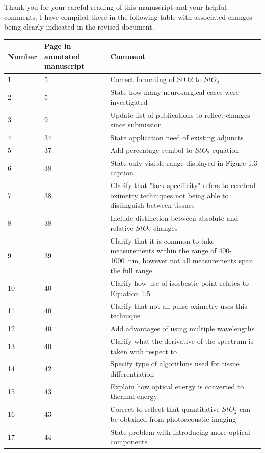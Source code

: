 \documentclass{article}
\begin{document}
Thank you for your careful reading of this manuscript and your helpful comments. I have compiled these in the following table with associated changes being clearly indicated in the revised document. 

\begin{table}
    \centering
    \begin{tabular}{|p{1.5cm}|p{2cm}|p{7.5cm}|}
        \hline
        Number & Page in annotated manuscript & Comment \\
        \hline
        1 & 5 & Correct formating of StO2 to $StO_2$ \\
        2 & 5 & State how many neurosurgical cases were investigated \\
        3 & 9 & Update list of publications to reflect changes since submission \\
        4 & 34 & State application need of existing adjuncts \\
        5 & 37 & Add percentage symbol to $StO_2$ equation \\
        6 & 38 & State only visible range displayed in Figure 1.3 caption \\
        7 & 38 & Clarify that "lack specificity" refers to cerebral oximetry techniques not being able to distinguish between tissues \\
        8 & 38 & Include distinction between absolute and relative $StO_2$ changes \\
        9 & 39 & Clarify that it is common to take measurements within the range of 400-1000~nm, however not all measurements span the full range \\
        10 & 40 & Clarify how use of isosbestic point relates to Equation 1.5 \\
        11 & 40 & Clarify that not all pulse oximetry uses this technique \\
        12 & 40 & Add advantages of using multiple wavelengths \\
        13 & 40 & Clarify what the derivative of the spectrum is taken with respect to \\
        14 & 42 & Specify type of algorithms used for tissue differentiation \\
        15 & 43 & Explain how optical energy is converted to thermal energy \\ 
        16 & 43 & Correct to reflect that quantitative $StO_2$ can be obtained from photoacoustic imaging \\
        17 & 44 & State problem with introducing more optical components \\

\end{tabular}
\end{table}
\end{document}

